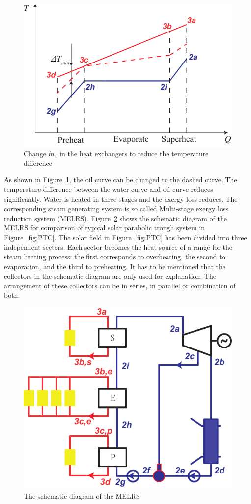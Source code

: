 \noindent \begin{figure}[htbp]
\begin{center}
	\includegraphics[width = 0.7\columnwidth]{fig/BetterCurve}
	\caption{Change $\dot{m}_3$ in the heat exchangers to reduce the temperature difference}
	\label{fig:BetterCurve}
\end{center}
\end{figure}

As shown in Figure~\ref{fig:BetterCurve}, the oil curve can be changed to the dashed curve. The temperature difference between the water curve and oil curve reduces significantly. Water is heated in three stages and the exergy loss reduces. The corresponding steam generating system is so called Multi-stage exergy loss reduction system (MELRS).
Figure~\ref{fig:SEP} shows the schematic diagram of the MELRS for comparison of typical solar parabolic trough system in Figure~\ref{fig:PTC}. The solar field in Figure~\ref{fig:PTC} has been divided into three independent sectors. Each sector becomes the heat source of a range for the steam heating process: the first corresponds to overheating, the second to evaporation, and the third to preheating. 
It has to be mentioned that the collectors in the schematic diagram are only used for explanation. The arrangement of these collectors can be in series, in parallel or combination of both.

\noindent \begin{figure}[htbp]
\begin{center}
	\includegraphics[width = 0.7\columnwidth]{fig/SEP}
	\caption{The schematic diagram of the MELRS}
	\label{fig:SEP}
\end{center}
\end{figure}

